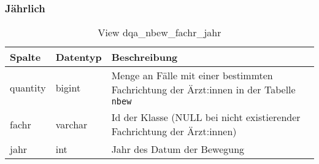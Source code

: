 \subsubsection{Jährlich} \label{subsubsec:bewFachrJ}

\begin{table}[ht]
	\centering   
	\caption{View dqa\_nbew\_fachr\_jahr}
	\label{tab:bewFachrJ}
	\begin{tabular}{||l|l|p{10cm}||}   		
		\hline
		Spalte & Datentyp & Beschreibung \\ [0.5ex]
		\hline\hline
		quantity & bigint & Menge an Fälle mit einer bestimmten Fachrichtung der Ärzt:innen in der Tabelle \texttt{nbew}\\
		\hline
		fachr & varchar & Id der Klasse (NULL bei nicht existierender Fachrichtung der Ärzt:innen)\\
		\hline
		jahr & int &  Jahr des Datum der Bewegung \\
		\hline		
	\end{tabular}
\end{table}